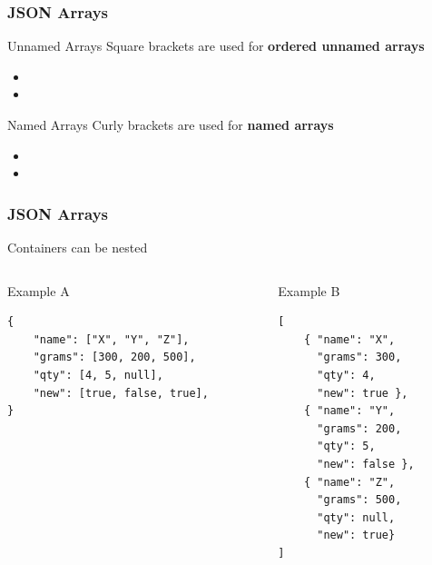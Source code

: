 \documentclass{beamer}\usepackage[]{graphicx}\usepackage[]{color}
\begin{document}
\begin{frame}
\frametitle{JSON Arrays}

\begin{block}{Unnamed Arrays}
Square brackets \highcode{[ ]} are used for \textbf{ordered unnamed arrays}
\begin{itemize}
 \item \code{ [ 1, 2, 3, ... ] }
 \item {}
\end{itemize}
\end{block}

\begin{block}{Named Arrays}
Curly brackets \highcode{\{ \}} are used for \textbf{named arrays}
\begin{itemize}
 \item {}
 \item {}
\end{itemize}
\end{block}

\end{frame}


\begin{frame}[fragile]
\frametitle{JSON Arrays}

Containers can be nested

\begin{columns}[t]
\begin{column}{0.5\textwidth}
\begin{block}{Example A}
{\footnotesize
\begin{verbatim}
{
    "name": ["X", "Y", "Z"],
    "grams": [300, 200, 500], 
    "qty": [4, 5, null],
    "new": [true, false, true],
}
\end{verbatim}
}
\end{block}
\end{column}

\begin{column}{0.5\textwidth}
\begin{block}{Example B}
{\footnotesize
\begin{verbatim}
[
    { "name": "X", 
      "grams": 300,
      "qty": 4,
      "new": true },
    { "name": "Y",
      "grams": 200,
      "qty": 5,
      "new": false },
    { "name": "Z",
      "grams": 500, 
      "qty": null,
      "new": true}
]
\end{verbatim}
}
\end{block}
\end{column}
\end{columns}

\end{frame}
\end{document}
